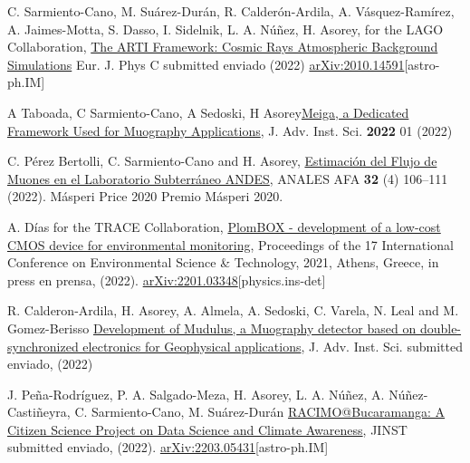\noindent
\begin{etaremune}

\item {} C. Sarmiento-Cano, M. Suárez-Durán, R. Calderón-Ardila, A. Vásquez-Ramírez, A. Jaimes-Motta, S. Dasso, I. Sidelnik, L. A. Núñez, H. Asorey, for the LAGO Collaboration, \href{}{The ARTI Framework: Cosmic Rays Atmospheric Background Simulations} Eur. J. Phys C \ifeng submitted \else enviado \fi (2022) \href{https://arxiv.org/abs/2010.14591}{arXiv:2010.14591}[astro-ph.IM]

\item {} A Taboada, C Sarmiento-Cano, A Sedoski, H Asorey\href{https://doi.org/10.31526/jais.2022.266}{Meiga, a Dedicated Framework Used for Muography Applications},  J. Adv. Inst. Sci. {\bf{2022}} 01 (2022) %

\item {} C. Pérez Bertolli, C. Sarmiento-Cano and H. Asorey, \href{https://afan.df.uba.ar/journal/index.php/analesafa/article/view/2300}{Estimación del Flujo de Muones en el Laboratorio Subterráneo ANDES}, ANALES AFA {\bf{32}} (4) 106--111 (2022). \ifeng Másperi Price 2020 \else Premio Másperi 2020\fi.

\item {} A. Días for the TRACE Collaboration, \href{}{PlomBOX - development of a low-cost CMOS device for environmental monitoring}, \en Proceedings of the 17 International Conference on Environmental Science \& Technology, 2021, Athens, Greece, \ifeng in press \else en prensa\fi, (2022). \href{http://arxiv.org/abs/2201.03348}{arXiv:2201.03348}[physics.ins-det]

\item {} R. Calderon-Ardila, H. Asorey, A. Almela, A. Sedoski, C. Varela, N. Leal and M. Gomez-Berisso \href{}{Development of Mudulus, a Muography detector based on
double-synchronized electronics for Geophysical applications}, J. Adv. Inst. Sci. \ifeng submitted \else enviado\fi, (2022)

\item {} J. Peña-Rodríguez, P. A. Salgado-Meza, H. Asorey, L. A. Núñez, A. Núñez-Castiñeyra, C. Sarmiento-Cano, M. Suárez-Durán \href{}{RACIMO@Bucaramanga: A Citizen Science Project on Data Science and Climate Awareness}, JINST \ifeng submitted \else enviado\fi, (2022). \href{http://arxiv.org/abs/2203.05431}{arXiv:2203.05431}[astro-ph.IM]


\end{etaremune}
